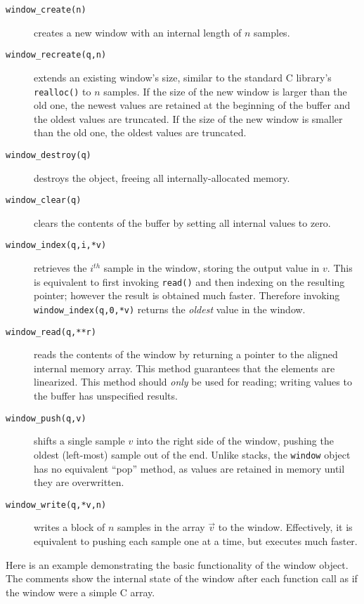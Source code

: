 \begin{description}
\item[{\tt window\_create(n)}]
    creates a new window with an internal length of $n$ samples.
\item[{\tt window\_recreate(q,n)}]
    extends an existing window's size, similar to the standard C library's
    {\tt realloc()} to $n$ samples.
    If the size of the new window is larger than the old one, the newest
    values are retained at the beginning of the buffer and the oldest
    values are truncated.
    If the size of the new window is smaller than the old one, the
    oldest values are truncated.
\item[{\tt window\_destroy(q)}]
    destroys the object, freeing all internally-allocated memory.
\item[{\tt window\_clear(q)}]
    clears the contents of the buffer by setting all internal values to zero.
\item[{\tt window\_index(q,i,*v)}]
    retrieves the $i^{th}$ sample in the window, storing the output
    value in $v$.
    This is equivalent to first invoking {\tt read()} and then indexing
    on the resulting pointer;
    however the result is obtained much faster.
    Therefore invoking {\tt window\_index(q,0,*v)} returns the
    {\em oldest} value in the window.
\item[{\tt window\_read(q,**r)}]
    reads the contents of the window by returning a pointer to the
    aligned internal memory array.
    This method guarantees that the elements are linearized.
    This method should {\em only} be used for reading; writing values to
    the buffer has unspecified results.
\item[{\tt window\_push(q,v)}]
    shifts a single sample $v$ into the right side of the window,
    pushing the oldest (left-most) sample out of the end.
    Unlike stacks, the {\tt window} object has no equivalent ``pop''
    method, as values are retained in memory until they are overwritten.
\item[{\tt window\_write(q,*v,n)}]
    writes a block of $n$ samples in the array $\vec{v}$ to the window.
    Effectively, it is equivalent to pushing each sample one at a time,
    but executes much faster.
\end{description}

Here is an example demonstrating the basic functionality of the window object.
The comments show the internal state of the window after each function call as
if the window were a simple C array.
%



